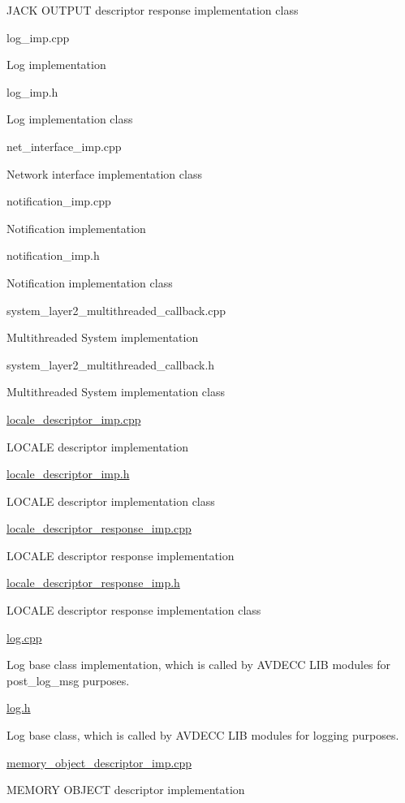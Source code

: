 J\+A\+CK O\+U\+T\+P\+UT descriptor response implementation class

log\+\_\+imp.\+cpp

Log implementation

log\+\_\+imp.\+h

Log implementation class

net\+\_\+interface\+\_\+imp.\+cpp

Network interface implementation class

notification\+\_\+imp.\+cpp

Notification implementation

notification\+\_\+imp.\+h

Notification implementation class

system\+\_\+layer2\+\_\+multithreaded\+\_\+callback.\+cpp

Multithreaded System implementation

system\+\_\+layer2\+\_\+multithreaded\+\_\+callback.\+h

Multithreaded System implementation class

\hyperlink{locale__descriptor__imp_8cpp}{locale\+\_\+descriptor\+\_\+imp.\+cpp}

L\+O\+C\+A\+LE descriptor implementation

\hyperlink{locale__descriptor__imp_8h}{locale\+\_\+descriptor\+\_\+imp.\+h}

L\+O\+C\+A\+LE descriptor implementation class

\hyperlink{locale__descriptor__response__imp_8cpp}{locale\+\_\+descriptor\+\_\+response\+\_\+imp.\+cpp}

L\+O\+C\+A\+LE descriptor response implementation

\hyperlink{locale__descriptor__response__imp_8h}{locale\+\_\+descriptor\+\_\+response\+\_\+imp.\+h}

L\+O\+C\+A\+LE descriptor response implementation class

\hyperlink{log_8cpp}{log.\+cpp}

Log base class implementation, which is called by A\+V\+D\+E\+CC L\+IB modules for post\+\_\+log\+\_\+msg purposes.

\hyperlink{log_8h}{log.\+h}

Log base class, which is called by A\+V\+D\+E\+CC L\+IB modules for logging purposes.

\hyperlink{memory__object__descriptor__imp_8cpp}{memory\+\_\+object\+\_\+descriptor\+\_\+imp.\+cpp}

M\+E\+M\+O\+RY O\+B\+J\+E\+CT descriptor implementation

